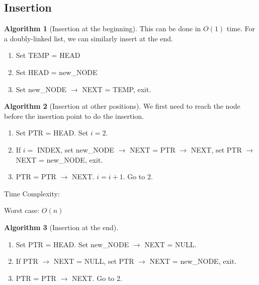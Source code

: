 \documentclass[10pt, a4paper]{extarticle}
\theoremstyle{definition}
\newtheorem{alg}{Algorithm}
\begin{document}
	\subsection{Insertion}
	\begin{alg}[Insertion at the beginning]
		This can be done in $O(1)$ time. For a doubly-linked list, we can similarly insert at the end.
		\begin{enumerate}
			\item Set TEMP = HEAD
			\item Set HEAD = new\_NODE
			\item Set new\_NODE $\to$ NEXT = TEMP, exit.
	\end{enumerate}
		
	\end{alg}
	\begin{alg}[Insertion at other positions]
		We first need to reach the node before the insertion point to do the insertion.
		\begin{enumerate}
			\item Set PTR = HEAD. Set $i=2$.
			\item If $i=$ INDEX, set new\_NODE $\to$ NEXT = PTR $\to$ NEXT, set PTR $\to$ NEXT = new\_NODE, exit.
			\item PTR = PTR $\to$ NEXT. $i=i+1$. Go to 2.
	\end{enumerate}
	Time Complexity:

	Worst case: $O(n)$
	\end{alg}

	\begin{alg}[Insertion at the end]
		\hfill
		\begin{enumerate}
			\item Set PTR = HEAD. Set new\_NODE $\to$ NEXT = NULL.
			\item If PTR $\to$ NEXT = NULL, set PTR $\to$ NEXT = new\_NODE, exit.
			\item PTR = PTR $\to$ NEXT. Go to 2.
	\end{enumerate}
	\end{alg}
\end{document}
